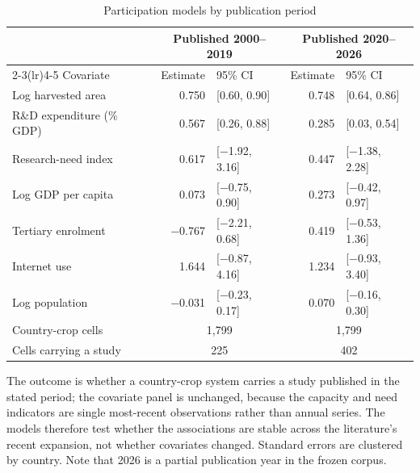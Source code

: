 \begin{table}[!t]
\centering
\footnotesize
\caption{Participation models by publication period}
\label{tab:periods}
\begin{tabular*}{\textwidth}{@{\extracolsep\fill}l r@{\hspace{6pt}}l r@{\hspace{6pt}}l@{}}
\toprule
& \multicolumn{2}{c}{Published 2000--2019} & \multicolumn{2}{c}{Published 2020--2026} \\
\cmidrule(lr){2-3}\cmidrule(lr){4-5}
Covariate & Estimate & 95\% CI & Estimate & 95\% CI \\
\midrule
Log harvested area & 0.750 & [0.60, 0.90] & 0.748 & [0.64, 0.86] \\
R\&D expenditure (\% GDP) & 0.567 & [0.26, 0.88] & 0.285 & [0.03, 0.54] \\
Research-need index & 0.617 & [$-$1.92, 3.16] & 0.447 & [$-$1.38, 2.28] \\
Log GDP per capita & 0.073 & [$-$0.75, 0.90] & 0.273 & [$-$0.42, 0.97] \\
Tertiary enrolment & $-$0.767 & [$-$2.21, 0.68] & 0.419 & [$-$0.53, 1.36] \\
Internet use & 1.644 & [$-$0.87, 4.16] & 1.234 & [$-$0.93, 3.40] \\
Log population & $-$0.031 & [$-$0.23, 0.17] & 0.070 & [$-$0.16, 0.30] \\
\midrule
Country-crop cells & \multicolumn{2}{c}{1,799} & \multicolumn{2}{c}{1,799} \\
Cells carrying a study & \multicolumn{2}{c}{225} & \multicolumn{2}{c}{402} \\
\bottomrule
\end{tabular*}
\begin{tablenotes}
\item[] The outcome is whether a country-crop system carries a study published in the stated period; the covariate panel is unchanged, because the capacity and need indicators are single most-recent observations rather than annual series. The models therefore test whether the associations are stable across the literature's recent expansion, not whether covariates changed. Standard errors are clustered by country. Note that 2026 is a partial publication year in the frozen corpus.
\end{tablenotes}
\end{table}
